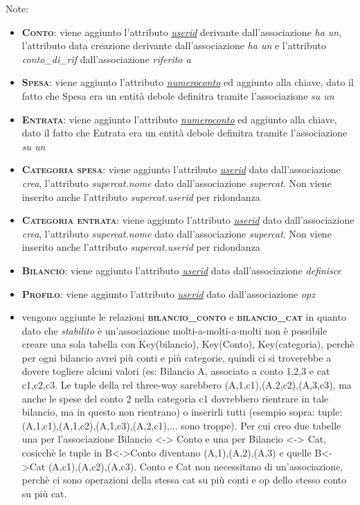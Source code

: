 \documentclass[a4paper,10pt]{article}
\newcommand{\assoc}[1]{\textit{#1}}
\newcommand{\relaz}[1]{\textsc{\textbf{#1}}}
\newcommand{\attr}[1]{\textsf{#1}}
\newcommand{\key}[1]{\uline{#1}}
\newcommand{\fkey}[1]{\textit{#1}}
\begin{document}
Note:
\begin{itemize}
\item\relaz{Conto}: viene aggiunto l'attributo \attr{\fkey{\key{userid}}} derivante dall'associazione \assoc{ha un}, l'attributo \attr{data creazione} derivante dall'associazione \assoc{ha un} e l'attributo \attr{\fkey{conto\_{}di\_{}rif}} dall'associazione \assoc{riferito a}
\item\relaz{Spesa}: viene aggiunto l'attributo \attr{\fkey{\key{numeroconto}}} ed aggiunto alla chiave, dato il fatto che Spesa era un entità debole definitra tramite l'associazione \assoc{su un}
\item\relaz{Entrata}: viene aggiunto l'attributo \attr{\fkey{\key{numeroconto}}} ed aggiunto alla chiave, dato il fatto che Entrata era un entità debole definitra tramite l'associazione \assoc{su un}
\item\relaz{Categoria spesa}: viene aggiunto l'attributo \attr{\fkey{\key{userid}}} dato dall'associazione \assoc{crea}, l'attributo \attr{\fkey{supercat.nome}} dato dall'associazione \assoc{supercat}. Non viene inserito anche l'attributo \attr{\fkey{supercat.userid}} per ridondanza
\item\relaz{Categoria entrata}: viene aggiunto l'attributo \attr{\fkey{\key{userid}}} dato dall'associazione \assoc{crea}, l'attributo \attr{\fkey{supercat.nome}} dato dall'associazione \assoc{supercat}. Non viene inserito anche l'attributo \attr{\fkey{supercat.userid}} per ridondanza
\item\relaz{Bilancio}: viene aggiunto l'attributo \attr{\fkey{\key{userid}}} dato dall'associazione \assoc{definisce}
\item\relaz{Profilo}: viene aggiunto l'attributo \attr{\fkey{\key{userid}}} dato dall'associazione \assoc{opz}
\item{}vengono aggiunte le relazioni \relaz{bilancio\_{}conto} e \relaz{bilancio\_{}cat} in quanto dato che \assoc{stabilito} è un'associazione molti-a-molti-a-molti non è possibile creare una sola tabella con Key(bilancio), Key(Conto), Key(categoria), perchè per ogni bilancio avrei più conti e più categorie, quindi ci si troverebbe a dovere togliere alcuni valori (es: Bilancio A, associato a conto 1,2,3 e cat c1,c2,c3. Le tuple della rel three-way sarebbero (A,1,c1),(A,2,c2),(A,3,c3), ma anche le spese del conto 2 nella categoria c1 dovrebbero rientrare in tale bilancio, ma in questo non rientrano) o inserirli tutti (esempio sopra: tuple: (A,1,c1),(A,1,c2),(A,1,c3),(A,2,c1),... sono troppe). Per cui creo due tabelle una per l'associazione Bilancio <-> Conto e una per Bilancio <-> Cat, cosicchè le tuple in B<->Conto diventano (A,1),(A,2),(A,3) e quelle B<->Cat (A,c1),(A,c2),(A,c3). Conto e Cat non necessitano di un'associazione, perchè ci sono operazioni della stessa cat su più conti e op dello stesso conto su più cat.
\end{itemize}
\end{document}
